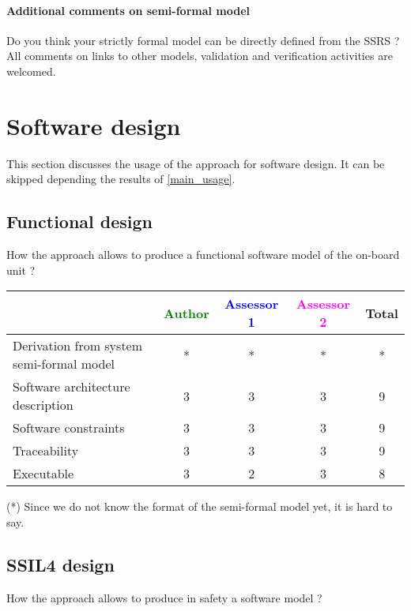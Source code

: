 \paragraph{Additional comments on semi-formal  model} Do you think your strictly formal  model can be directly defined from the SSRS ?
All comments on links to  other models, validation and verification activities are welcomed.


\section{Software design}
This section discusses the usage of the approach for software design.
It can be skipped depending the results of \ref{main_usage}.

\subsection{Functional design}

How the approach allows to  produce a functional software model of the on-board unit ?

\begin{tabular}{|l | c | c | c | c|}
\hline
& \textcolor{green}{Author} & \textcolor{blue}{Assessor 1} & \textcolor{magenta}{Assessor 2} & Total \\
\hline
Derivation from system semi-formal model  &* &* & *& * \\
\hline 
Software architecture description  &3 &3 & 3& 9 \\
\hline
Software constraints  &3 &3 & 3& 9 \\
\hline
Traceability  &3 &3 & 3& 9 \\
\hline
Executable  &3 &2 & 3& 8 \\
\hline
\end{tabular}
\begin{author_comment}
(*) Since we do not know the format of the semi-formal model  yet, it is hard to say.
\end{author_comment}

\subsection{SSIL4 design}

How the approach allows to  produce in safety a software model ?


